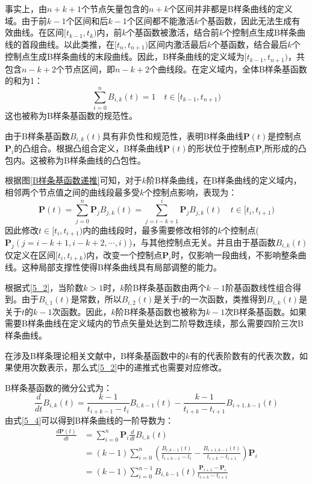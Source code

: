 事实上，由$n+k+1$个节点矢量包含的$n+k$个区间并非都是B样条曲线的定义域。由于前$k-1$个区间和后$k-1$个区间都不能激活$k$个基函数，因此无法生成有效曲线。在区间$[t_{k-1},t_{k})$内，前$k$个基函数被激活，结合前$k$个控制点生成B样条曲线的首段曲线。以此类推，在$[t_{n},t_{n+1})$区间内激活最后$k$个基函数，结合最后$k$个控制点生成B样条曲线的末段曲线。因此，B样条曲线的定义域为$[t_{k-1},t_{n+1})$，共包含$n-k+2$个节点区间，即$n-k+2$个曲线段。在定义域内，全体B样条基函数的和为1：
\begin{equation}
    \sum_{i=0}^{n}B_{i,k}(t)=1 \quad t\in[t_{k-1},t_{n+1})
    \label{5_3}
\end{equation}
这也被称为B样条基函数的规范性。

由于B样条基函数$B_{i,k}(t)$具有非负性和规范性，表明B样条曲线$\boldsymbol{P}(t)$是控制点$\boldsymbol{P}_i$的凸组合。根据凸组合定义，B样条曲线$\boldsymbol{P}(t)$的形状位于控制点$\boldsymbol{P}_i$所形成的凸包内。这被称为B样条曲线的凸包性。

根据图\ref{B样条基函数递推}可知，对于$k$阶B样条曲线，在B样条曲线的定义域内，相邻两个节点值之间的曲线段最多受$k$个控制点影响，表现为：
\begin{equation}
    \boldsymbol{P}(t)=\sum_{j=0}^{n}\boldsymbol{P}_{j}B_{j,k}(t)=\sum_{j=i-k+1}^{i}\boldsymbol{P}_{j}B_{j,k}(t)\quad t\in[t_{i},t_{i+1})
    \label{5_4}
\end{equation}
因此修改$t\in[t_{i},t_{i+1})$内的曲线段时，最多需要修改相邻的$k$个控制点($\boldsymbol{P}_j(j=i-k+1,i-k+2,\cdots,i)$)，与其他控制点无关。并且由于基函数$B_{i,k}(t)$仅定义在区间$[t_i, t_{i+k})$内，改变一个控制点$\boldsymbol{P}_i$时，仅影响一段曲线，不影响整条曲线。这种局部支撑性使得B样条曲线具有局部调整的能力。

根据式\eqref{5_2}，当阶数$k>1$时，$k$阶B样条基函数由两个$k-1$阶基函数线性组合得到。由于$B_{i,1}(t)$是常数，所以$B_{i,2}(t)$是关于$t$的一次函数，类推得到$B_{i,k}(t)$是关于$t$的$k-1$次函数。因此，$k$阶B样条基函数也被称为$k-1$次B样条基函数。如果需要B样条曲线在定义域内的节点矢量处达到二阶导数连续，那么需要四阶三次B样条曲线。

在涉及B样条理论相关文献中，B样条基函数中的$k$有的代表阶数有的代表次数，如果使用次数表示，那么式\eqref{5_2}中的递推式也需要对应修改。

B样条基函数的微分公式为\cite{计算机图形学}：
\begin{equation}
    \frac{d}{dt}B_{i,k}(t)=\frac{k-1}{t_{i+k-1}-t_i}B_{i,k-1}(t)-\frac{k-1}{t_{i+k}-t_{i+1}}B_{i+1,k-1}(t)
    \label{5_5}
\end{equation}
由式\eqref{5_4}可以得到B样条曲线的一阶导数为：
\begin{equation}
    \begin{aligned}
        \frac{d\boldsymbol{P}(t)}{dt} & =\sum_{i=0}^{n}\boldsymbol{P}_{i}\frac{d}{dt}B_{i,k}(t) \\
         & =(k-1)\sum_{i=0}^{n}\left(\frac{B_{i,k-1}(t)}{t_{i+k-1}-t_{i}}-\frac{B_{i+1,k-1}(t)}{t_{i+k}-t_{i+1}}\right)\boldsymbol{P}_{i} \\
         & =(k-1)\sum_{i=0}^{n-1}B_{i,k-1}(t)\frac{\boldsymbol{P}_{i+1}-\boldsymbol{P}_{i}}{t_{i+k}-t_{i+1}}
        \end{aligned}
    \label{5_6}
\end{equation}

